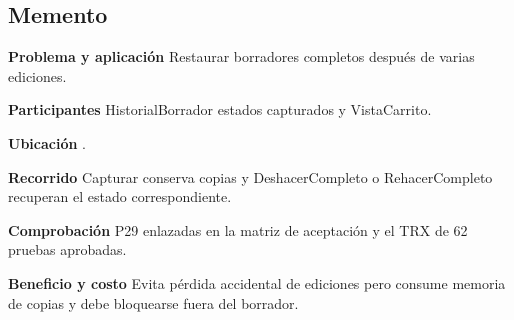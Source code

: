\noindent\begin{minipage}{\linewidth}
\subsection{Memento}
\textbf{Problema y aplicación} Restaurar borradores completos después de varias ediciones.

\textbf{Participantes} HistorialBorrador estados capturados y VistaCarrito.

\textbf{Ubicación} \href{https://github.com/Alan77-bot/LogiMarket360Alan/blob/68bda51063441415524ede51bdf61649ee9b4973/LogiMarket.Domain/Pedidos/HistorialBorrador.cs#L9}{}.

\textbf{Recorrido} Capturar conserva copias y DeshacerCompleto o RehacerCompleto recuperan el estado correspondiente.


\textbf{Comprobación} P29 enlazadas en la matriz de aceptación y el TRX de 62 pruebas aprobadas.

\textbf{Beneficio y costo} Evita pérdida accidental de ediciones pero consume memoria de copias y debe bloquearse fuera del borrador.

\end{minipage}\par\smallskip
